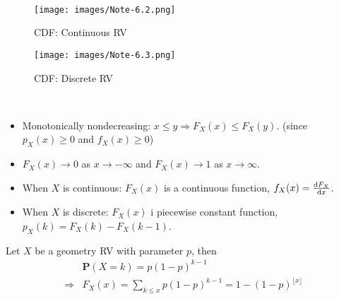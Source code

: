\begin{example} ~
    \begin{figure}[H]
        \centering
        \texttt{[image: images/Note-6.2.png]}
        \caption{CDF: Continuous RV}
    \end{figure}
    \begin{figure}[H]
        \centering
        \texttt{[image: images/Note-6.3.png]}
        \caption{CDF: Discrete RV}
    \end{figure}
\end{example}

\begin{property} ~
    \begin{itemize}
        \item Monotonically nondecreasing: $x \leq y \Rightarrow F_{X}(x) \leq F_{X}(y)$. (since $p_{X}(x) \geq 0$ and $f_{X}(x) \geq 0$)
        \item $F_X(x) \to 0$ as $x \to -\infty$ and $F_X(x) \to 1$ as $x \to \infty$.
        \item When $X$ is continuous: $F_{X}(x)$ is a continuous function, $f_{X}(x) = \dv{F_X}{x}$.
        \item When $X$ is discrete: $F_{X}(x)$ i piecewise constant function, $p_{X}(k) = F_{X}(k) - F_{X}(k-1)$.
    \end{itemize}
\end{property}

\begin{example}
    Let $X$ be a geometry RV with parameter $p$, then
    \begin{equation}
    \begin{aligned}
        &\mathbf{P}(X = k) = p(1 - p)^{k - 1} \\ 
        \Rightarrow &F_{X}(x) = \sum_{k \leq x} p(1 - p)^{k - 1} = 1 - (1 - p)^{\lfloor x \rfloor}
    \end{aligned}
    \end{equation}
\end{example}

